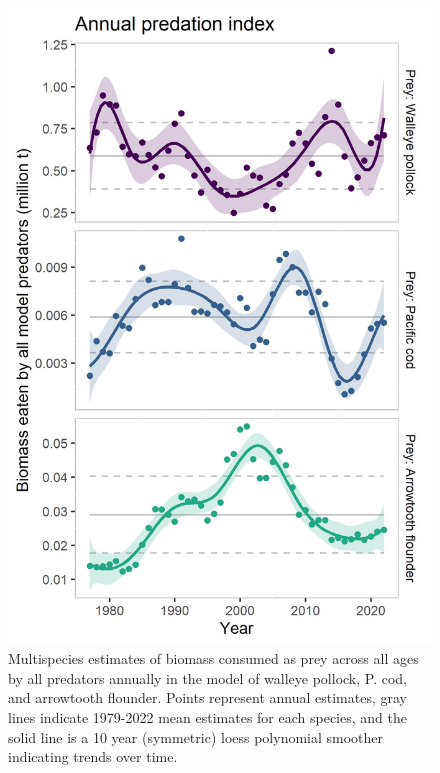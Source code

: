 \documentclass[
]{article}
\begin{document}
\begin{figure}
\centering
\includegraphics{Results/ESR_Fig2.jpg}
\caption{Multispecies estimates of biomass consumed as prey across all
ages by all predators annually in the model of walleye pollock, P. cod,
and arrowtooth flounder. Points represent annual estimates, gray lines
indicate 1979-2022 mean estimates for each species, and the solid line
is a 10 year (symmetric) loess polynomial smoother indicating trends
over time.}
\end{figure}
\end{document}
